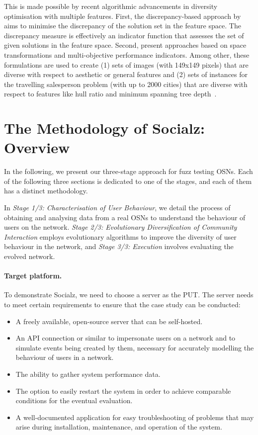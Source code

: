 \documentclass[dvipsnames,format=sigconf,anonymous=False,review=false, balance=false]{acmart}
\begin{document}
This is made possible by recent algorithmic advancements in diversity optimisation with multiple features. 
First, the discrepancy-based approach by \citet{neumann2018discrepancy} aims to minimise the discrepancy of the solution set in the feature space. The discrepancy measure is effectively an indicator function that assesses the set of given solutions in the feature space.
Second, \citet{neumann2019moo} present approaches based on space transformations and multi-objective performance indicators. Among other, these formulations are used to create (1) sets of images (with 149x149 pixels) 
that are diverse with respect to aesthetic or general features and (2) sets of instances for the travelling salesperson problem 
(with up to 2000 cities) 
that are diverse with respect to features like hull ratio and minimum spanning tree depth~\cite{bossek2019tsplarge}.


\section{The Methodology of Socialz: Overview}\label{sec:methodology}

In the following, we present our three-stage approach for fuzz testing OSNs. Each of the following three sections is dedicated to one of the stages, and each of them has a distinct methodology.

In \textit{Stage 1/3: Characterisation of User Behaviour}, we detail the process of obtaining and analysing data from a real OSNs to understand the behaviour of users on the network. 
\textit{Stage 2/3: Evolutionary Diversification of Community Interaction} employs evolutionary algorithms to improve the diversity of user behaviour in the network, and 
\textit{Stage 3/3: Execution} involves  evaluating the evolved network. 

\paragraph{Target platform.} \label{sec:gitlab} 
To demonstrate Socialz, we need to choose a server as the PUT. The server needs to  meet certain requirements to ensure that the case study can be conducted: 

\begin{itemize}
\item A freely available, open-source server that can be self-hosted.
\item An API connection or similar to impersonate users on a network and to simulate events being created by them, necessary for accurately modelling the behaviour of users in a network.
\item The ability to gather system performance data.
\item The option to easily restart the system in order to achieve comparable conditions for the eventual evaluation.
\item A well-documented application for easy troubleshooting of problems that may arise during installation, maintenance, and operation of the system.
\end{itemize}
\end{document}

